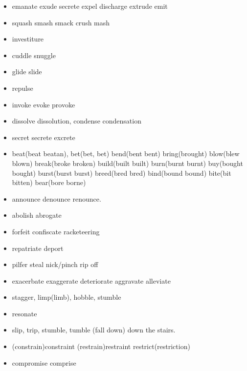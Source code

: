 \documentclass[a4paper,11pt,twoside]{book}
\begin{document}
\begin{itemize}
	\item emanate exude secrete expel discharge extrude emit
	
	\item squash smash smack crush mash 
	
	\item investiture 
	
	\item cuddle snuggle
	
	\item glide slide
	
	\item repulse
	
	\item invoke evoke provoke
	
	\item dissolve dissolution, condense condensation 
	
	\item secret secrete excrete
	
	\item beat(beat beatan), bet(bet, bet) bend(bent bent) bring(brought) blow(blew blown) break(broke broken) build(built built) burn(burnt burnt) buy(bought bought) burst(burst burst) breed(bred bred) bind(bound bound) 
	bite(bit bitten) bear(bore borne)
	
	\item announce denounce renounce. 
	
	\item abolish abrogate
	
	\item forfeit confiscate racketeering 
	
	\item repatriate deport
	
	\item pilfer steal nick/pinch rip off 
	
	\item exacerbate exaggerate deteriorate aggravate alleviate 
	
	\item stagger, limp(limb), hobble, stumble 

	\item resonate
	
	\item slip, trip, stumble,  tumble (fall down) down the stairs. 
	
	\item (constrain)constraint (restrain)restraint restrict(restriction)
	\item compromise comprise 
	

\end{itemize}
\end{document}
